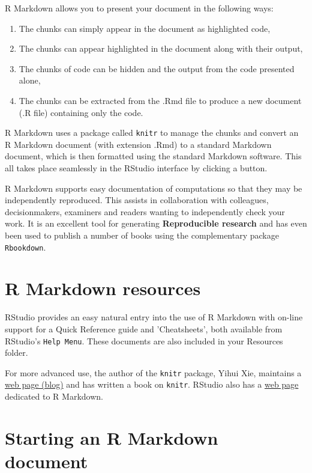 \documentclass[titlepage]{book}\usepackage{knitr}
\begin{document}
  R Markdown allows you to present your document in the following ways:
  
\begin{enumerate}
\item{The chunks can simply appear in the document as highlighted code,}
\item{The chunks can appear highlighted in the document along with their output,} 
\item{The chunks of code can be hidden and the output from the code presented alone,}
\item{The chunks can be extracted from the .Rmd file to produce a new document (.R file) containing only the code.}
\end{enumerate}

R Markdown uses a package called \texttt{knitr} to manage the chunks and convert an R Markdown document (with extension .Rmd) to a standard Markdown document, which is then formatted using the standard Markdown software. This all takes place seamlessly in the RStudio interface by clicking a button.

R Markdown supports easy documentation of computations so that they may be independently reproduced. This assists in collaboration with colleagues, decisionmakers, examiners and readers wanting to independently check your work. It is an excellent tool for generating \textbf{Reproducible research} and has even been used to publish a number of books using the complementary package \texttt{Rbookdown}.

\section{R Markdown resources}

RStudio provides an easy natural entry into the use of R Markdown with on-line support for a Quick Reference guide and 'Cheatsheets', both available from RStudio's \texttt{Help Menu}. These documents are also included in your Resources folder.

For more advanced use, the author of the \texttt{knitr} package, Yihui Xie, maintains a \href{https://yihui.name/en/}{web page (blog)} and has written a book \cite{Xie2013} on \texttt{knitr}. RStudio also has a \href{http://rmarkdown.rstudio.com/}{web page} dedicated to R Markdown.


\section{Starting an R Markdown document}
\end{document}
